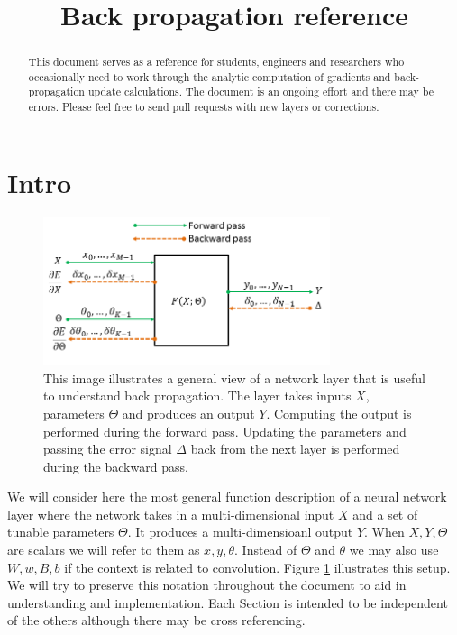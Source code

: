 \documentclass[a4paper]{article}
\title{Back propagation reference}
\begin{document}
\maketitle

\begin{abstract}
This document serves as a reference for students, engineers and researchers who occasionally need to work through the analytic computation of gradients and back-propagation update calculations. The document is an ongoing effort and there may be errors. Please feel free to send pull requests with new layers or corrections.
\end{abstract}

\tableofcontents
\newpage
\section{Intro}
\begin{figure}\label{fig:general}
\centering
\includegraphics[width=0.75\textwidth]{ForwardBackward.png}
\caption{This image illustrates a general view of a network layer that is useful to understand back propagation. The layer takes inputs $X$, parameters $\Theta$ and produces an output $Y$. Computing the output is performed during the forward pass. Updating the parameters and passing the error signal $\Delta$ back from the next layer is performed during the backward pass.}
\end{figure}
We will consider here the most general function description of a neural network layer where the network takes in a multi-dimensional input $X$ and a set of tunable parameters $\Theta$. It produces a multi-dimensioanl output $Y$. When $X,Y,\Theta$ are scalars we will refer to them as $x,y,\theta$. Instead of $\Theta$ and $\theta$ we may also use $W,w,B,b$ if the context is related to convolution. Figure \ref{fig:general} illustrates this setup. We will try to preserve this notation throughout the document to aid in understanding and implementation. Each Section is intended to be independent of the others although there may be cross referencing.
\end{document}
